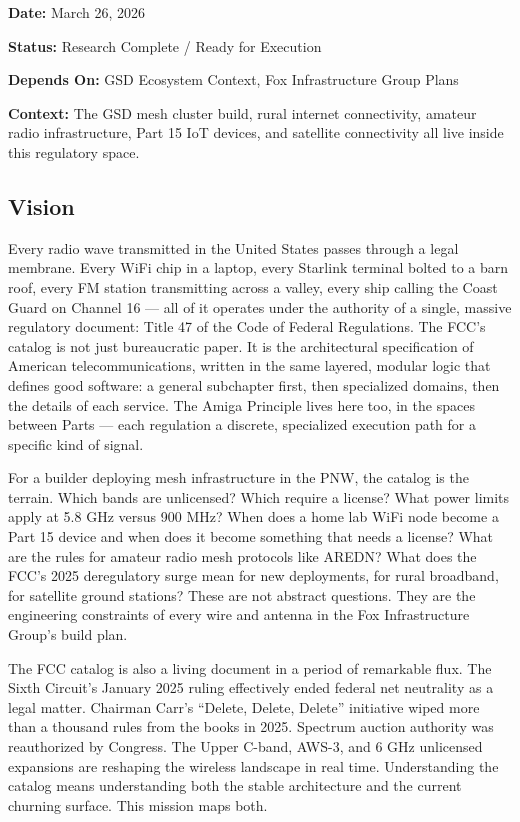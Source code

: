 \documentclass[11pt,letterpaper]{article}
\newcommand{\metafield}[2]{\textbf{\sffamily #1} #2\par}
\begin{document}
\metafield{Date:}{March 26, 2026}
\metafield{Status:}{Research Complete / Ready for Execution}
\metafield{Depends On:}{GSD Ecosystem Context, Fox Infrastructure Group Plans}
\metafield{Context:}{The GSD mesh cluster build, rural internet connectivity, amateur radio infrastructure, Part 15 IoT devices, and satellite connectivity all live inside this regulatory space.}

\subsection{Vision}

Every radio wave transmitted in the United States passes through a legal membrane. Every WiFi chip in a laptop, every Starlink terminal bolted to a barn roof, every FM station transmitting across a valley, every ship calling the Coast Guard on Channel 16 --- all of it operates under the authority of a single, massive regulatory document: Title 47 of the Code of Federal Regulations. The FCC's catalog is not just bureaucratic paper. It is the architectural specification of American telecommunications, written in the same layered, modular logic that defines good software: a general subchapter first, then specialized domains, then the details of each service. The Amiga Principle lives here too, in the spaces between Parts --- each regulation a discrete, specialized execution path for a specific kind of signal.

For a builder deploying mesh infrastructure in the PNW, the catalog is the terrain. Which bands are unlicensed? Which require a license? What power limits apply at 5.8 GHz versus 900 MHz? When does a home lab WiFi node become a Part 15 device and when does it become something that needs a license? What are the rules for amateur radio mesh protocols like AREDN? What does the FCC's 2025 deregulatory surge mean for new deployments, for rural broadband, for satellite ground stations? These are not abstract questions. They are the engineering constraints of every wire and antenna in the Fox Infrastructure Group's build plan.

The FCC catalog is also a living document in a period of remarkable flux. The Sixth Circuit's January 2025 ruling effectively ended federal net neutrality as a legal matter. Chairman Carr's ``Delete, Delete, Delete'' initiative wiped more than a thousand rules from the books in 2025. Spectrum auction authority was reauthorized by Congress. The Upper C-band, AWS-3, and 6 GHz unlicensed expansions are reshaping the wireless landscape in real time. Understanding the catalog means understanding both the stable architecture and the current churning surface. This mission maps both.
\end{document}

